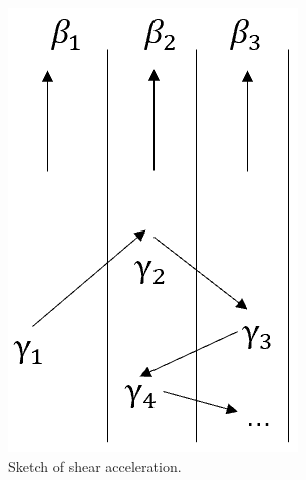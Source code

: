 \documentclass[10pt,aspectratio=169,mathserif]{beamer}
\begin{document}
\begin{frame}
\begin{columns}
     \begin{column}{0.5\textwidth}
        \begin{figure}
        \centering
        \includegraphics[scale=0.4]{shearacc.png}
        \caption{Sketch of shear acceleration.}
        \label{fig:confine}
        \end{figure}
     \end{column}
 \end{columns}
\end{frame}
\end{document}
